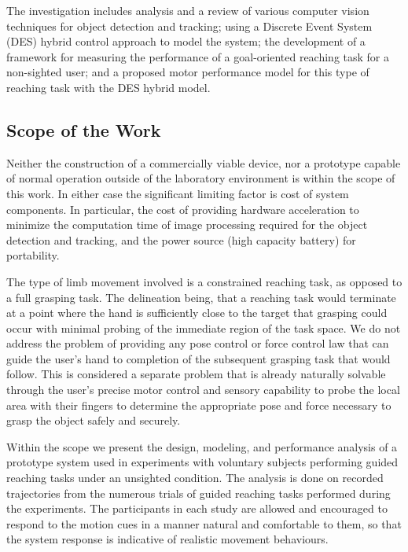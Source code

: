 The investigation includes analysis and a review of various computer vision techniques for object detection and tracking; using a Discrete Event System (DES) hybrid control approach to model the system; the development of a framework for measuring the performance of a goal-oriented reaching task for a non-sighted user; and a proposed motor performance model for this type of reaching task with the DES hybrid model.

\subsection{Scope of the Work}\label{ch:Introduction:sec:ReserachGoal:ssec:Scope}

Neither the construction of a commercially viable device, nor a prototype capable of normal operation outside of the laboratory environment is within the scope of this work.  In either case the significant limiting factor is cost of system components.  In particular, the cost of providing hardware acceleration to minimize the computation time of image processing required for the object detection and tracking, and the power source (high capacity battery) for portability.

The type of limb movement involved is a constrained reaching task, as opposed to a full grasping task.  The delineation being, that a reaching task would terminate at a point where the hand is sufficiently close to the target that grasping could occur with minimal probing of the immediate region of the task space.  We do not address the problem of providing any pose control or force control law that can guide the user's hand to completion of the subsequent grasping task that would follow.  This is considered a separate problem that is already naturally solvable through the user's precise motor control and sensory capability to probe the local area with their fingers to determine the appropriate pose and force necessary to grasp the object safely and securely.

Within the scope we present the design, modeling, and performance analysis of a prototype system used in experiments with voluntary subjects performing guided reaching tasks under an unsighted condition.  The analysis is done on recorded trajectories from the numerous trials of guided reaching tasks performed during the experiments.  The participants in each study are allowed and encouraged to respond to the motion cues in a manner natural and comfortable to them, so that the system response is indicative of realistic movement behaviours.

